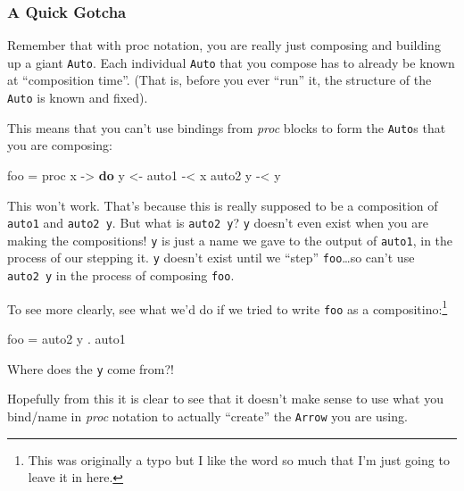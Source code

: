\documentclass[]{article}
\newenvironment{Shaded}{}{}
\newcommand{\KeywordTok}[1]{\textcolor[rgb]{0.00,0.44,0.13}{\textbf{{#1}}}}
\newcommand{\OtherTok}[1]{\textcolor[rgb]{0.00,0.44,0.13}{{#1}}}
\newcommand{\FunctionTok}[1]{\textcolor[rgb]{0.02,0.16,0.49}{{#1}}}
\newcommand{\NormalTok}[1]{{#1}}
\begin{document}
\subsubsection{A Quick Gotcha}\label{a-quick-gotcha}

Remember that with proc notation, you are really just composing and
building up a giant \texttt{Auto}. Each individual \texttt{Auto} that
you compose has to already be known at ``composition time''. (That is,
before you ever ``run'' it, the structure of the \texttt{Auto} is known
and fixed).

This means that you can't use bindings from \emph{proc} blocks to form
the \texttt{Auto}s that you are composing:

\begin{Shaded}
\begin{Highlighting}[]
\NormalTok{foo }\FunctionTok{=} \NormalTok{proc x }\OtherTok{->} \KeywordTok{do}
    \NormalTok{y }\OtherTok{<-} \NormalTok{auto1 }\FunctionTok{-<} \NormalTok{x}
    \NormalTok{auto2 y }\FunctionTok{-<} \NormalTok{y}
\end{Highlighting}
\end{Shaded}

This won't work. That's because this is really supposed to be a
composition of \texttt{auto1} and \texttt{auto2\ y}. But what is
\texttt{auto2\ y}? \texttt{y} doesn't even exist when you are making the
compositions! \texttt{y} is just a name we gave to the output of
\texttt{auto1}, in the process of our stepping it. \texttt{y} doesn't
exist until we ``step'' \texttt{foo}\ldots{}so can't use
\texttt{auto2\ y} in the process of composing \texttt{foo}.

To see more clearly, see what we'd do if we tried to write \texttt{foo}
as a compositino:\footnote{This was originally a typo but I like the
  word so much that I'm just going to leave it in here.}

\begin{Shaded}
\begin{Highlighting}[]
\NormalTok{foo }\FunctionTok{=} \NormalTok{auto2 y }\FunctionTok{.} \NormalTok{auto1}
\end{Highlighting}
\end{Shaded}

Where does the \texttt{y} come from?!

Hopefully from this it is clear to see that it doesn't make sense to use
what you bind/name in \emph{proc} notation to actually ``create'' the
\texttt{Arrow} you are using.
\end{document}
